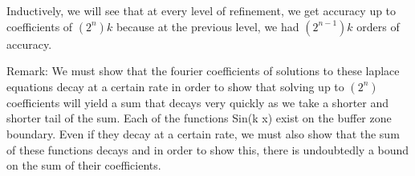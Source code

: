 \documentclass[12pt]{article}
\begin{document}
    Inductively, we will see that at every level of refinement, we get accuracy up to coefficients of $(2^n) k$ because at the previous level, we had $(2^{n-1}) k$ orders of accuracy.
    
    Remark: We must show that the fourier coefficients of solutions to these laplace equations decay at a certain rate in order to show that solving up to $(2^{n})$ coefficients will yield a sum that decays very quickly as we take a shorter and shorter tail of the sum. Each of the functions Sin(k x) exist on the buffer zone boundary. Even if they decay at a certain rate, we must also show that the sum of these functions decays and in order to show this, there is undoubtedly a bound on the sum of their coefficients. 
    
    
    
    
    
    
    
    





{\footnotesize



}
\end{document}
